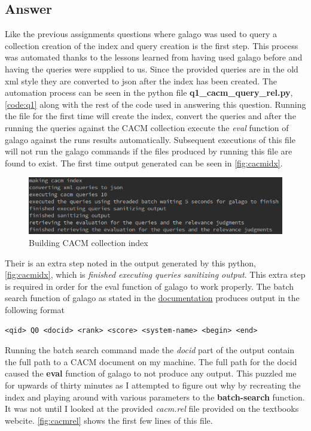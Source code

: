 \documentclass[11pt]{article}
\begin{document}
\subsection{Answer} 
Like the previous assignments questions where galago was used to query a collection creation of the index and query creation is the first step. This process was automated thanks to the lessons learned from having used galago before and having the queries were supplied to us. Since the provided queries are in the old xml style they are converted to json after the index has been created.  The automation process can be seen in the python file \textbf{q1\_cacm\_query\_rel.py}, \autoref{code:q1} along with the rest of the code used in answering this question. Running the file  for the first time will create the index, convert the queries and after the running the queries against the CACM collection execute the \textit{eval} function of galago against the runs results automatically. Subsequent executions of this file will not run the galago commands if the files produced by running this file are found to exist. The first time output generated can be seen in  \autoref{fig:cacmidx}.
\begin{figure}[H]
\centering
\includegraphics[scale=0.7]{q1buildidx.png}
\caption{Building CACM collection index}
\label{fig:cacmidx}
\end{figure}
Their is an extra step noted in the output generated by this python, \autoref{fig:cacmidx}, which is \textit{finished executing queries sanitizing output}. This extra step is required in order for the eval function of galago to work properly. The batch search function of galago as stated in the \href{https://sourceforge.net/p/lemur/wiki/Galago\%20Functions/}{documentation} produces output in the following format 
\begin{verbatim}
<qid> Q0 <docid> <rank> <score> <system-name> <begin> <end>
\end{verbatim}
Running the batch search command made the \textit{docid} part of the output contain the full path to a CACM document on my machine. The full path for the docid caused the \textbf{eval} function of galago to not produce any output. This puzzled me for upwards of thirty minutes as I attempted to figure out why by recreating the index and playing around with various parameters to the \textbf{batch-search} function. It was not until I looked at the provided \textit{cacm.rel} file provided on the textbooks webcite. \autoref{fig:cacmrel} shows the first few lines of this file.
\end{document}
